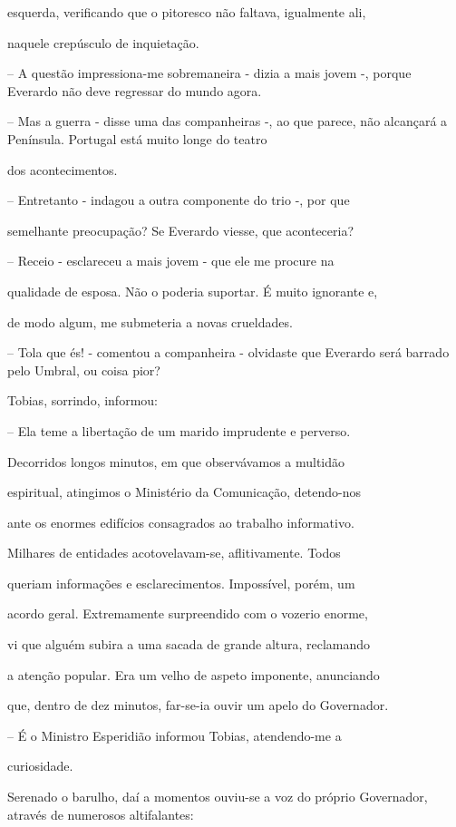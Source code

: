 \documentclass[portuguese,12pt,a4paper]{scrbook}
\begin{document}
	esquerda, verificando que o pitoresco não faltava, igualmente ali,
	
	naquele crepúsculo de inquietação.
	
	
	– A questão impressiona-me sobremaneira - dizia a mais jovem -, porque Everardo não deve regressar do mundo agora.
	
	– Mas a guerra - disse uma das companheiras -, ao que parece, não alcançará a Península. Portugal está muito longe do teatro
	
	dos acontecimentos.
	
	– Entretanto - indagou a outra componente do trio -, por que
	
	semelhante preocupação? Se Everardo viesse, que aconteceria?
	
	– Receio - esclareceu a mais jovem - que ele me procure na
	
	qualidade de esposa. Não o poderia suportar. É muito ignorante e,
	
	de modo algum, me submeteria a novas crueldades.
	
	– Tola que és! - comentou a companheira - olvidaste que Everardo será barrado pelo Umbral, ou coisa pior?
	
	Tobias, sorrindo, informou:
	
	– Ela teme a libertação de um marido imprudente e perverso.
	
	Decorridos longos minutos, em que observávamos a multidão
	
	espiritual, atingimos o Ministério da Comunicação, detendo-nos
	
	ante os enormes edifícios consagrados ao trabalho informativo.
	
	Milhares de entidades acotovelavam-se, aflitivamente. Todos
	
	queriam informações e esclarecimentos. Impossível, porém, um
	
	acordo geral. Extremamente surpreendido com o vozerio enorme,
	
	vi que alguém subira a uma sacada de grande altura, reclamando
	
	a atenção popular. Era um velho de aspeto imponente, anunciando
	
	que, dentro de dez minutos, far-se-ia ouvir um apelo do Governador.
	
	– É o Ministro Esperidião informou Tobias, atendendo-me a
	
	curiosidade.
	
	Serenado o barulho, daí a momentos ouviu-se a voz do próprio Governador, através de numerosos altifalantes:
	
\end{document}

